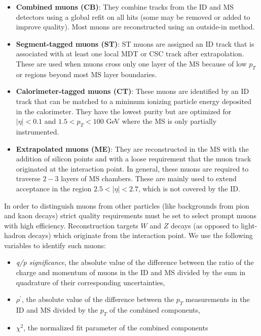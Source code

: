 \begin{itemize}
\item \textbf{Combined muons (CB)}: They combine tracks from the ID and MS detectors using a global refit on all hits (some may be removed or added to improve quality). Most muons are reconstructed using an outside-in method. 
\item \textbf{Segment-tagged muons (ST)}: ST muons are assigned an ID track that is associated with at least one local MDT or CSC track after extrapolation. These are used when muons cross only one layer of the MS because of low $p_T$ or regions beyond most MS layer boundaries. 
\item \textbf{Calorimeter-tagged muons (CT)}: These muons are identified by an ID track that can be matched to a minimum ionizing particle energy deposited in the calorimeter. They have the lowest purity but are optimized for $|\eta|  < 0.1$ and $1.5 < p_T < 100$ GeV where the MS is only partially instrumented. 
\item \textbf{Extrapolated muons (ME)}: They are reconstructed in the MS with the addition of silicon points and with a loose requirement that the muon track originated at the interaction point. In general, these muons are required to traverse $2-3$ layers of MS chambers. These are mainly used to extend acceptance in the region $2.5 < |\eta| < 2.7$, which is not covered by the ID. 
\end{itemize}

In order to distinguish muons from other particles (like backgrounds from pion and kaon decays) strict quality requirements must be set to select prompt muons with high efficiency. Reconstruction targets $W$ and $Z$ decays (as opposed to light-hadron decays) which originate from the interaction point. We use the following variables to identify such muons:
\begin{itemize}
\item \textit{q/p significance}, the absolute value of the difference between the ratio of the charge and momentum of muons in the ID and MS divided by the sum in quadrature of their corresponding uncertainties,
\item \textit{$\rho^\prime$}, the absolute value of the difference between the $p_T$ measurements in the ID and MS divided by the $p_T$ of the combined components, 
\item \textit{$\chi ^2$}, the normalized fit parameter of the combined components
\end{itemize}


